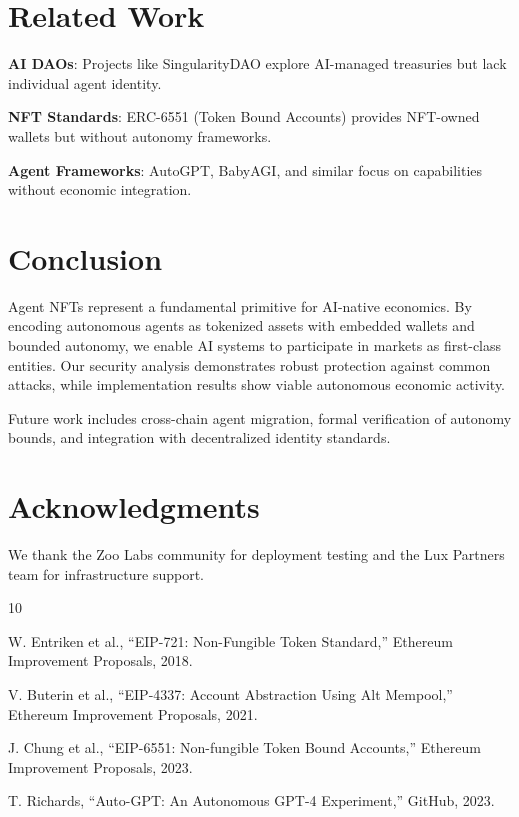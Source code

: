 \documentclass[11pt,letterpaper]{article}
\begin{document}
\section{Related Work}

\textbf{AI DAOs}: Projects like SingularityDAO explore AI-managed treasuries but lack individual agent identity.

\textbf{NFT Standards}: ERC-6551 (Token Bound Accounts) provides NFT-owned wallets but without autonomy frameworks.

\textbf{Agent Frameworks}: AutoGPT, BabyAGI, and similar focus on capabilities without economic integration.

\section{Conclusion}

Agent NFTs represent a fundamental primitive for AI-native economics. By encoding autonomous agents as tokenized assets with embedded wallets and bounded autonomy, we enable AI systems to participate in markets as first-class entities. Our security analysis demonstrates robust protection against common attacks, while implementation results show viable autonomous economic activity.

Future work includes cross-chain agent migration, formal verification of autonomy bounds, and integration with decentralized identity standards.

\section*{Acknowledgments}

We thank the Zoo Labs community for deployment testing and the Lux Partners team for infrastructure support.


\begin{thebibliography}{10}

W. Entriken et al., ``EIP-721: Non-Fungible Token Standard,'' Ethereum Improvement Proposals, 2018.

V. Buterin et al., ``EIP-4337: Account Abstraction Using Alt Mempool,'' Ethereum Improvement Proposals, 2021.

J. Chung et al., ``EIP-6551: Non-fungible Token Bound Accounts,'' Ethereum Improvement Proposals, 2023.

T. Richards, ``Auto-GPT: An Autonomous GPT-4 Experiment,'' GitHub, 2023.

\end{thebibliography}
\end{document}
